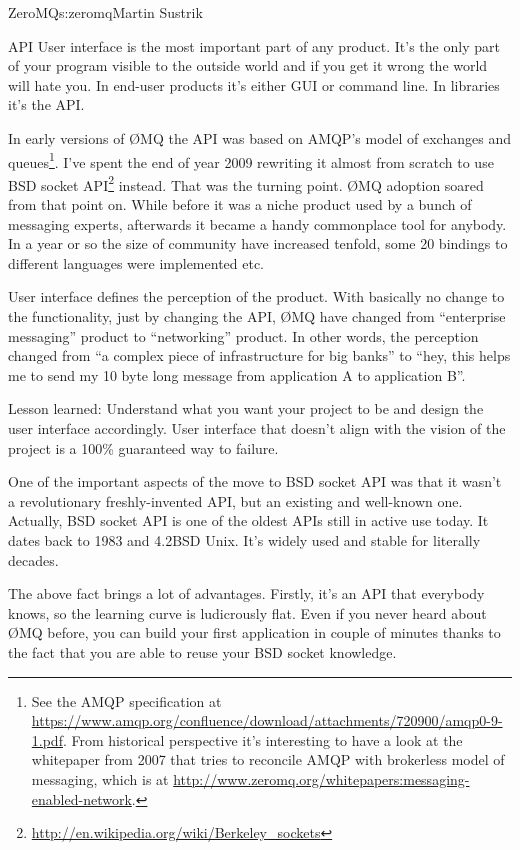 \begin{aosachapter}{ZeroMQ}{s:zeromq}{Martin Sustrik}
\begin{aosasect1}{API}
User interface is the most important part of any product. It's the
only part of your program visible to the outside world and if you get
it wrong the world will hate you. In end-user products it's either GUI
or command line. In libraries it's the API.

In early versions of {\O}MQ the API was based on AMQP's model of
exchanges and queues\footnote{See the AMQP specification at
  \url{https://www.amqp.org/confluence/download/attachments/720900/amqp0-9-1.pdf}. From
  historical perspective it's interesting to have a look at the
  whitepaper from 2007 that tries to reconcile AMQP with brokerless
  model of messaging, which is at
  \url{http://www.zeromq.org/whitepapers:messaging-enabled-network}.}. I've
spent the end of year 2009 rewriting it almost from scratch to use BSD
socket
API\footnote{\url{http://en.wikipedia.org/wiki/Berkeley\_sockets}}
instead. That was the turning point. {\O}MQ adoption soared from that
point on. While before it was a niche product used by a bunch of
messaging experts, afterwards it became a handy commonplace tool for
anybody. In a year or so the size of community have increased tenfold,
some 20 bindings to different languages were implemented etc.

User interface defines the perception of the product. With basically
no change to the functionality, just by changing the API, {\O}MQ have
changed from ``enterprise messaging'' product to ``networking''
product. In other words, the perception changed from ``a complex piece
of infrastructure for big banks'' to ``hey, this helps me to send my
10 byte long message from application A to application B''.

Lesson learned: Understand what you want your project to be and design
the user interface accordingly. User interface that doesn't align with
the vision of the project is a 100\% guaranteed way to failure.

One of the important aspects of the move to BSD socket API was that it
wasn't a revolutionary freshly-invented API, but an existing and
well-known one. Actually, BSD socket API is one of the oldest APIs
still in active use today. It dates back to 1983 and 4.2BSD Unix. It's
widely used and stable for literally decades.

The above fact brings a lot of advantages.  Firstly, it's an API that
everybody knows, so the learning curve is ludicrously flat. Even if
you never heard about {\O}MQ before, you can build your first application
in couple of minutes thanks to the fact that you are able to reuse
your BSD socket knowledge.


\end{aosasect1}
\end{aosachapter}
